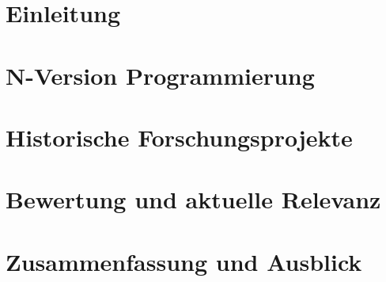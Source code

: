 \documentclass{llncs}
\begin{document}
\mainmatter  %


\tableofcontents

\cleardoublepage

\section{Einleitung} \label{einleitung}


\section{N-Version Programmierung} \label{definition}


\section{Historische Forschungsprojekte} \label{beispiele}


\section{Bewertung und aktuelle Relevanz} \label{bewertung}


\section{Zusammenfassung und Ausblick} \label{zusammenfassung-ausblick}



\clearpage




%
\end{document}
